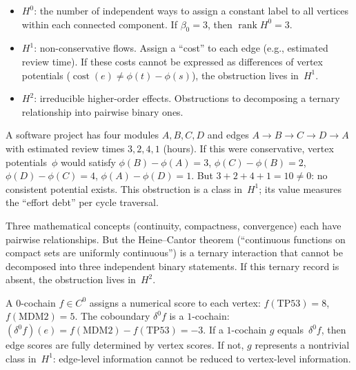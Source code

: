 \begin{itemize}
\item $H^0$: the number of independent ways to assign a constant label to all vertices within each connected component. If $\beta_0 = 3$, then $\operatorname{rank} H^0 = 3$.
\item $H^1$: non-conservative flows. Assign a ``cost'' to each edge (e.g., estimated review time). If these costs cannot be expressed as differences of vertex potentials ($\operatorname{cost}(e) \neq \phi(t) - \phi(s)$), the obstruction lives in~$H^1$.
\item $H^2$: irreducible higher-order effects. Obstructions to decomposing a ternary relationship into pairwise binary ones.
\end{itemize}

\begin{example}
A software project has four modules $A, B, C, D$ and edges $A \to B \to C \to D \to A$ with estimated review times $3, 2, 4, 1$ (hours). If this were conservative, vertex potentials~$\phi$ would satisfy $\phi(B)-\phi(A) = 3$, $\phi(C)-\phi(B) = 2$, $\phi(D)-\phi(C) = 4$, $\phi(A)-\phi(D) = 1$. But $3+2+4+1 = 10 \neq 0$: no consistent potential exists. This obstruction is a class in~$H^1$; its value measures the ``effort debt'' per cycle traversal.
\end{example}

\begin{example}
Three mathematical concepts (continuity, compactness, convergence) each have pairwise relationships. But the Heine--Cantor theorem (``continuous functions on compact sets are uniformly continuous'') is a ternary interaction that cannot be decomposed into three independent binary statements. If this ternary record is absent, the obstruction lives in~$H^2$.
\end{example}

\begin{example}
A $0$-cochain $f \in C^0$ assigns a numerical score to each vertex: $f(\mathrm{TP53}) = 8$, $f(\mathrm{MDM2}) = 5$. The coboundary $\delta^0 f$ is a $1$-cochain: $(\delta^0 f)(e) = f(\mathrm{MDM2}) - f(\mathrm{TP53}) = -3$. If a $1$-cochain $g$ equals~$\delta^0 f$, then edge scores are fully determined by vertex scores. If not, $g$ represents a nontrivial class in~$H^1$: edge-level information cannot be reduced to vertex-level information.
\end{example}

